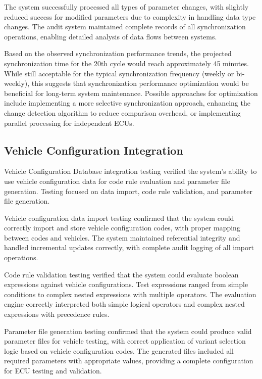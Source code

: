 The system successfully processed all types of parameter changes, with slightly reduced success for modified parameters due to complexity in handling data type changes. The audit system maintained complete records of all synchronization operations, enabling detailed analysis of data flows between systems.

Based on the observed synchronization performance trends, the projected synchronization time for the 20th cycle would reach approximately 45 minutes. While still acceptable for the typical synchronization frequency (weekly or bi-weekly), this suggests that synchronization performance optimization would be beneficial for long-term system maintenance. Possible approaches for optimization include implementing a more selective synchronization approach, enhancing the change detection algorithm to reduce comparison overhead, or implementing parallel processing for independent ECUs.

\subsection{Vehicle Configuration Integration}
\label{subsec:vehicle-configuration-testing}

Vehicle Configuration Database integration testing verified the system's ability to use vehicle configuration data for code rule evaluation and parameter file generation. Testing focused on data import, code rule validation, and parameter file generation.

Vehicle configuration data import testing confirmed that the system could correctly import and store vehicle configuration codes, with proper mapping between codes and vehicles. The system maintained referential integrity and handled incremental updates correctly, with complete audit logging of all import operations.

Code rule validation testing verified that the system could evaluate boolean expressions against vehicle configurations. Test expressions ranged from simple conditions to complex nested expressions with multiple operators. The evaluation engine correctly interpreted both simple logical operators and complex nested expressions with precedence rules.

Parameter file generation testing confirmed that the system could produce valid parameter files for vehicle testing, with correct application of variant selection logic based on vehicle configuration codes. The generated files included all required parameters with appropriate values, providing a complete configuration for ECU testing and validation.

